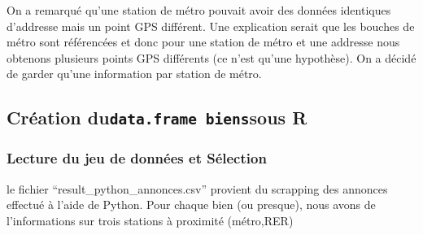 \documentclass[french,]{article}
\newenvironment{Shaded}{\begin{snugshade}}{\end{snugshade}}
\newcommand{\CommentTok}[1]{\textcolor[rgb]{0.56,0.35,0.01}{\textit{#1}}}
\newcommand{\DataTypeTok}[1]{\textcolor[rgb]{0.13,0.29,0.53}{#1}}
\newcommand{\DecValTok}[1]{\textcolor[rgb]{0.00,0.00,0.81}{#1}}
\newcommand{\KeywordTok}[1]{\textcolor[rgb]{0.13,0.29,0.53}{\textbf{#1}}}
\newcommand{\NormalTok}[1]{#1}
\newcommand{\OperatorTok}[1]{\textcolor[rgb]{0.81,0.36,0.00}{\textbf{#1}}}
\newcommand{\StringTok}[1]{\textcolor[rgb]{0.31,0.60,0.02}{#1}}
\begin{document}
On a remarqué qu'une station de métro pouvait avoir des données
identiques d'addresse mais un point GPS différent. Une explication
serait que les bouches de métro sont référencées et donc pour une
station de métro et une addresse nous obtenons plusieurs points GPS
différents (ce n'est qu'une hypothèse). On a décidé de garder qu'une
information par station de métro.

\begin{Shaded}
\end{Shaded}

\hypertarget{cruxe9ation-dudata.frame-bienssous-r}{%
\subsection{\texorpdfstring{Création du\texttt{data.frame\ biens}sous
R}{Création dudata.frame bienssous R}}\label{cruxe9ation-dudata.frame-bienssous-r}}

\hypertarget{lecture-du-jeu-de-donnuxe9es-et-suxe9lection-1}{%
\subsubsection{Lecture du jeu de données et
Sélection}\label{lecture-du-jeu-de-donnuxe9es-et-suxe9lection-1}}

le fichier ``result\_python\_annonces.csv'' provient du scrapping des
annonces effectué à l'aide de Python. Pour chaque bien (ou presque),
nous avons de l'informations sur trois stations à proximité (métro,RER)
\end{document}

